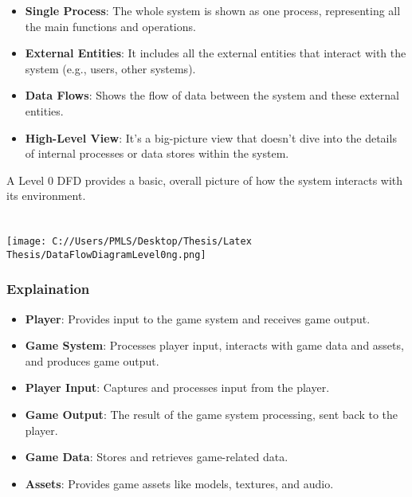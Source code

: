 \begin{itemize}
	\item \textbf{Single Process}: The whole system is shown as one process, representing all the main functions and operations.
	\item \textbf{External Entities}: It includes all the external entities that interact with the system (e.g., users, other systems).
	\item \textbf{Data Flows}: Shows the flow of data between the system and these external entities.
	\item \textbf{High-Level View}: It’s a big-picture view that doesn't dive into the details of internal processes or data stores within the system.
\end{itemize}

A Level 0 DFD provides a basic, overall picture of how the system interacts with its environment.
\\
\\
\\

\texttt{[image: C://Users/PMLS/Desktop/Thesis/Latex Thesis/DataFlowDiagramLevel0ng.png]}

\subsubsection{Explaination}

\begin{itemize}
	\item \textbf{Player}: Provides input to the game system and receives game output.
	\item \textbf{Game System}: Processes player input, interacts with game data and assets, and produces game output.
	\item \textbf{Player Input}: Captures and processes input from the player.
	\item \textbf{Game Output}: The result of the game system processing, sent back to the player.
	\item \textbf{Game Data}: Stores and retrieves game-related data.
	\item \textbf{Assets}: Provides game assets like models, textures, and audio.
\end{itemize}

